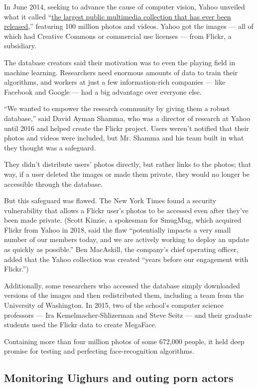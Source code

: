 In June 2014, seeking to advance the cause of computer vision, Yahoo
unveiled what it called ``\href{https://arxiv.org/abs/1503.01817}{the
largest public multimedia collection that has ever been released},''
featuring 100 million photos and videos. Yahoo got the images --- all of
which had Creative Commons or commercial use licenses --- from Flickr, a
subsidiary.

The database creators said their motivation was to even the playing
field in machine learning. Researchers need enormous amounts of data to
train their algorithms, and workers at just a few information-rich
companies --- like Facebook and Google --- had a big advantage over
everyone else.

``We wanted to empower the research community by giving them a robust
database,'' said David Ayman Shamma, who was a director of research at
Yahoo until 2016 and helped create the Flickr project. Users weren't
notified that their photos and videos were included, but Mr. Shamma and
his team built in what they thought was a safeguard.

They didn't distribute users' photos directly, but rather links to the
photos; that way, if a user deleted the images or made them private,
they would no longer be accessible through the database.

But this safeguard was flawed. The New York Times found a security
vulnerability that allows a Flickr user's photos to be accessed even
after they've been made private. (Scott Kinzie, a spokesman for SmugMug,
which acquired Flickr from Yahoo in 2018, said the flaw ``potentially
impacts a very small number of our members today, and we are actively
working to deploy an update as quickly as possible.'' Ben MacAskill, the
company's chief operating officer, added that the Yahoo collection was
created ``years before our engagement with Flickr.'')

Additionally, some researchers who accessed the database simply
downloaded versions of the images and then redistributed them, including
a team from the University of Washington. In 2015, two of the school's
computer science professors --- Ira Kemelmacher-Shlizerman and Steve
Seitz --- and their graduate students used the Flickr data to create
MegaFace.

Containing more than four million photos of some 672,000 people, it held
deep promise for testing and perfecting face-recognition algorithms.

\hypertarget{monitoring-uighurs-and-outing-porn-actors}{%
\subsection{Monitoring Uighurs and outing porn
actors}\label{monitoring-uighurs-and-outing-porn-actors}}

